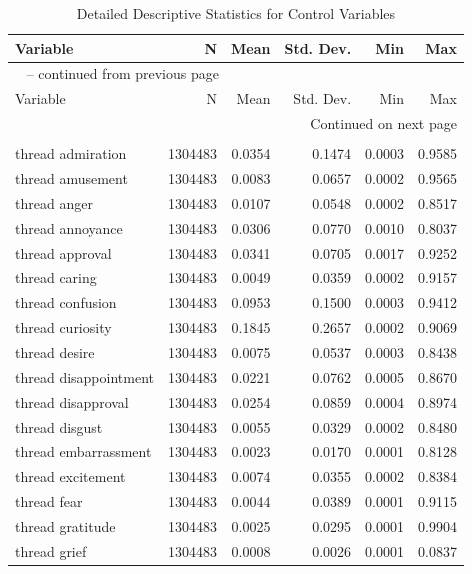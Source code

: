 \documentclass[11pt]{article}
\begin{document}
\begin{center}
\scriptsize
\setlength{\tabcolsep}{4pt}
\begin{longtable}{lrrrrr}
\caption{Detailed Descriptive Statistics for Control Variables}\label{tab:descriptive_controls}\\
\toprule
Variable & N & Mean & Std. Dev. & Min & Max \\
\midrule
\endfirsthead
\multicolumn{6}{l}{\tablename\ \thetable{} -- continued from previous page}\\
\toprule
Variable & N & Mean & Std. Dev. & Min & Max \\
\midrule
\endhead
\midrule
\multicolumn{6}{r}{Continued on next page}\\
\endfoot
\bottomrule
\endlastfoot
\addlinespace
\multicolumn{6}{l}{\textit{Thread-title emotion controls}} \\
thread admiration & 1304483 & 0.0354 & 0.1474 & 0.0003 & 0.9585 \\
thread amusement & 1304483 & 0.0083 & 0.0657 & 0.0002 & 0.9565 \\
thread anger & 1304483 & 0.0107 & 0.0548 & 0.0002 & 0.8517 \\
thread annoyance & 1304483 & 0.0306 & 0.0770 & 0.0010 & 0.8037 \\
thread approval & 1304483 & 0.0341 & 0.0705 & 0.0017 & 0.9252 \\
thread caring & 1304483 & 0.0049 & 0.0359 & 0.0002 & 0.9157 \\
thread confusion & 1304483 & 0.0953 & 0.1500 & 0.0003 & 0.9412 \\
thread curiosity & 1304483 & 0.1845 & 0.2657 & 0.0002 & 0.9069 \\
thread desire & 1304483 & 0.0075 & 0.0537 & 0.0003 & 0.8438 \\
thread disappointment & 1304483 & 0.0221 & 0.0762 & 0.0005 & 0.8670 \\
thread disapproval & 1304483 & 0.0254 & 0.0859 & 0.0004 & 0.8974 \\
thread disgust & 1304483 & 0.0055 & 0.0329 & 0.0002 & 0.8480 \\
thread embarrassment & 1304483 & 0.0023 & 0.0170 & 0.0001 & 0.8128 \\
thread excitement & 1304483 & 0.0074 & 0.0355 & 0.0002 & 0.8384 \\
thread fear & 1304483 & 0.0044 & 0.0389 & 0.0001 & 0.9115 \\
thread gratitude & 1304483 & 0.0025 & 0.0295 & 0.0001 & 0.9904 \\
thread grief & 1304483 & 0.0008 & 0.0026 & 0.0001 & 0.0837 \\

\end{longtable}
\end{center}
\end{document}
